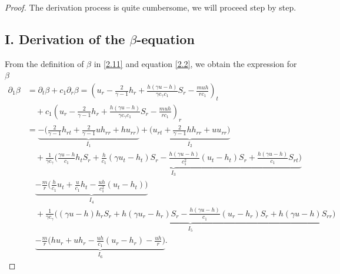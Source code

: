 \documentclass[10pt,a4paper]{amsart}
\begin{document}
\begin{proof}
The derivation process is quite cumbersome, we will proceed step by step.

\subsection*{I. Derivation of the $\beta$-equation}
From the definition of $\beta$ in \eqref{2.11} and equation \eqref{2.2}, we obtain the expression for $\beta$
\begin{align}\label{3.4}
\partial_1\beta &= \partial_t\beta + c_1\partial_r \beta  =\left(u_r-\frac{2}{\gamma-1}h_r+\frac{h(\gamma u-h)}{\gamma c_\gamma c_1}S_r-\frac{m uh}{rc_1}\right)_t \nonumber\\
    &\quad +c_1\left(u_r-\frac{2}{\gamma-1}h_r+\frac{h(\gamma u-h)}{\gamma c_\gamma c_1}S_r-\frac{m uh}{rc_1}\right)_r
    \nonumber\\
    &=\underbrace{-\Big(\frac{2}{\gamma-1}h_{rt}+\frac{2}{\gamma-1}uh_{rr}+hu_{rr}\Big)}_{I_1}
    +\underbrace{\Big(u_{rt}+\frac{2}{\gamma-1}hh_{rr}+uu_{rr}\Big)}_{I_2}
    \nonumber\\
    &\quad +\underbrace{\frac{1}{\gamma c_\gamma}\Big(\frac{\gamma u-h}{c_1}h_tS_r+\frac{h}{c_1}(\gamma u_t-h_t)S_r-\frac{h(\gamma u-h)}{c_1^2}(u_t-h_t)S_r+\frac{h(\gamma u-h)}{c_1}S_{rt}\Big)}_{I_3}
    \nonumber\\
    &\quad \underbrace{-\frac{m}{r}\Big(\frac{h}{c_1}u_t+\frac{u}{c_1}h_t-\frac{uh}{c_1^2}(u_t-h_t)\Big)}_{I_4}
    \nonumber\\
    &\quad +\underbrace{\frac{1}{\gamma c_\gamma}\Big((\gamma u-h)h_rS_r+h(\gamma u_r-h_r)S_r-\frac{h(\gamma u-h)}{c_1}(u_r-h_r)S_r+h(\gamma u-h)S_{rr}\Big)}_{I_5}
    \nonumber\\
    &\quad \underbrace{-\frac{m}{r}\Big(hu_r+uh_r-\frac{uh}{c_1}(u_r-h_r)-\frac{uh}{r}\Big)}_{I_6}.
\end{align}


\end{proof}
\end{document}

